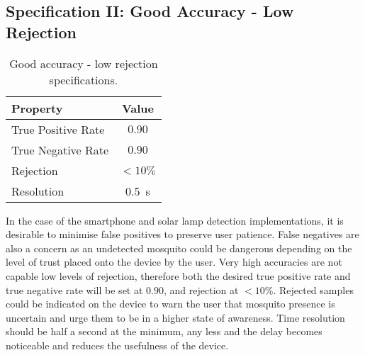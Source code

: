     \subsection{Specification II: Good Accuracy - Low Rejection}
    \label{subsec:exp-spec-lowrej}
        \begin{wraptable}{r}{0.3\textwidth}
            \scriptsize
            \singlespacing
            \centering
                \begin{tabular}{ |l||c| } 
                    \hline
                    Property & Value \\ 
                    \hline
                    \hline
                    True Positive Rate & $0.90$ \\
                    True Negative Rate & $0.90$ \\
                    Rejection & $<10\%$ \\
                    Resolution & \SI{0.5}{\second}\\
                    \hline
                \end{tabular}
            \caption{Good accuracy - low rejection specifications.}
            \label{tbl:exp-spec-lowrej-tbl}
        \end{wraptable} 
        In the case of the smartphone and solar lamp detection implementations, it is desirable to minimise false positives to preserve user patience. False negatives are also a concern as an undetected mosquito could be dangerous depending on the level of trust placed onto the device by the user. Very high accuracies are not capable low levels of rejection, therefore both the desired true positive rate and true negative rate will be set at $0.90$, and rejection at $<10\%$. Rejected samples could be indicated on the device to warn the user that mosquito presence is uncertain and urge them to be in a higher state of awareness. Time resolution should be half a second at the minimum, any less and the delay becomes noticeable and reduces the usefulness of the device.
        
